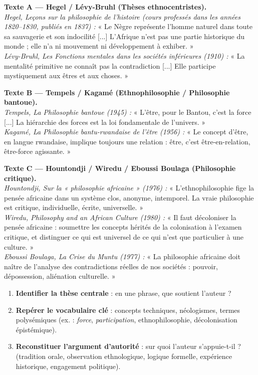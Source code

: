\documentclass[11pt]{article}
\newcommand{\cle}[1]{{\popxbold\color{popdark}#1}}
\begin{document}
\begin{exemplebox}
\textbf{Texte A — Hegel / Lévy-Bruhl (Thèses ethnocentristes).} \\
\textit{Hegel, \emph{Leçons sur la philosophie de l'histoire} (cours professés dans les années 1820--1830, publiés en 1837) :} « Le Nègre représente l'homme naturel dans toute sa sauvagerie et son indocilité [...] L'Afrique n'est pas une partie historique du monde ; elle n'a ni mouvement ni développement à exhiber. » \\
\textit{Lévy-Bruhl, \emph{Les Fonctions mentales dans les sociétés inférieures} (1910) :} « La mentalité primitive ne connaît pas la contradiction [...] Elle participe mystiquement aux êtres et aux choses. »

\textbf{Texte B — Tempels / Kagamé (Ethnophilosophie / Philosophie bantoue).} \\
\textit{Tempels, \emph{La Philosophie bantoue} (1945) :} « L'être, pour le Bantou, c'est la force [...] La hiérarchie des forces est la loi fondamentale de l'univers. » \\
\textit{Kagamé, \emph{La Philosophie bantu-rwandaise de l'être} (1956) :} « Le concept d'être, en langue rwandaise, implique toujours une relation : être, c'est être-en-relation, être-force agissante. »

\textbf{Texte C — Hountondji / Wiredu / Eboussi Boulaga (Philosophie critique).} \\
\textit{Hountondji, \emph{Sur la « philosophie africaine »} (1976) :} « L'ethnophilosophie fige la pensée africaine dans un système clos, anonyme, intemporel. La vraie philosophie est critique, individuelle, écrite, universelle. » \\
\textit{Wiredu, \emph{Philosophy and an African Culture} (1980) :} « Il faut décoloniser la pensée africaine : soumettre les concepts hérités de la colonisation à l'examen critique, et distinguer ce qui est universel de ce qui n'est que particulier à une culture. » \\
\textit{Eboussi Boulaga, \emph{La Crise du Muntu} (1977) :} « La philosophie africaine doit naître de l'analyse des contradictions réelles de nos sociétés : pouvoir, dépossession, aliénation culturelle. »
\end{exemplebox}

\begin{methode}
\begin{enumerate}
\item \textbf{Identifier la thèse centrale} : en une phrase, que soutient l'auteur ?
\item \textbf{Repérer le vocabulaire clé} : concepts techniques, néologismes, termes polysémiques (ex. : \emph{force}, \emph{participation}, \cle{ethnophilosophie}, \cle{décolonisation épistémique}).
\item \textbf{Reconstituer l'argument d'autorité} : sur quoi l'auteur s'appuie-t-il ? (tradition orale, observation ethnologique, logique formelle, expérience historique, engagement politique).
\end{enumerate}
\end{methode}
\end{document}
